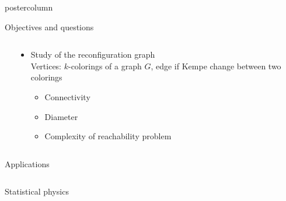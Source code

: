 \begin{frame}
\begin{beamercolorbox}[center,wd=\textwidth]{postercolumn}
\begin{minipage}[T]{.97\textwidth}
\begin{block}{Objectives and questions}
\begin{columns}
\begin{column}{.49\textwidth}
          \end{column}
          \begin{column}{.49\textwidth}
            \begin{itemize}
            \item Study of the reconfiguration graph\\ {\small Vertices: $k$-colorings of a
                graph $G$, edge if Kempe change between two colorings}
              \begin{itemize}
              \item Connectivity 
              \item Diameter
              \item Complexity of reachability problem
              \end{itemize}
            \end{itemize}
          \end{column}
        \end{columns}
      \end{block}
      
      \begin{block}{Applications}
        \begin{columns}
          \begin{column}{.45\textwidth}
            \begin{block}{Statistical physics}
              \centering
\end{block}
\end{column}
\end{columns}
\end{block}
\end{minipage}
\end{beamercolorbox}
\end{frame}

